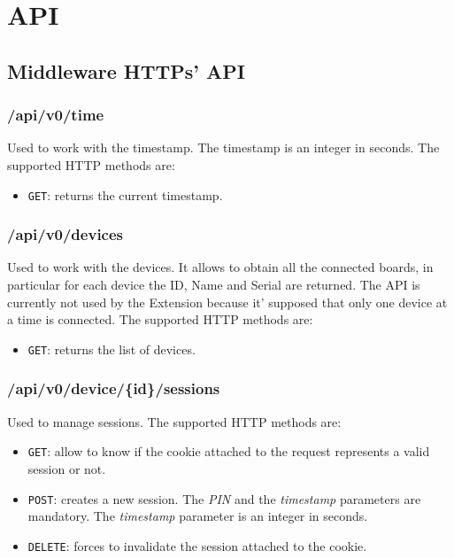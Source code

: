 \chapter{API}
\label{api}

\section{Middleware HTTPs' API}

\subsection{/api/v0/time}
Used to work with the timestamp. The timestamp is an integer in seconds. The supported HTTP methods are:

\begin{itemize}
    \item \texttt{GET}: returns the current timestamp.
\end{itemize}

\subsection{/api/v0/devices}
Used to work with the devices. It allows to obtain all the connected boards, in particular for each device the ID, Name and Serial are returned. The API is currently not used by the Extension because it' supposed that only one device at a time is connected. The supported HTTP methods are:

\begin{itemize}
    \item \texttt{GET}: returns the list of devices.
\end{itemize}

\subsection{/api/v0/device/\{id\}/sessions}
Used to manage sessions. The supported HTTP methods are:

\begin{itemize}
    \item \texttt{GET}: allow to know if the cookie attached to the request represents a valid session or not.
    \item \texttt{POST}: creates a new session. The \textit{PIN} and the \textit{timestamp} parameters are mandatory. The \textit{timestamp} parameter is an integer in seconds.
    \item \texttt{DELETE}: forces to invalidate the session attached to the cookie.
\end{itemize}

